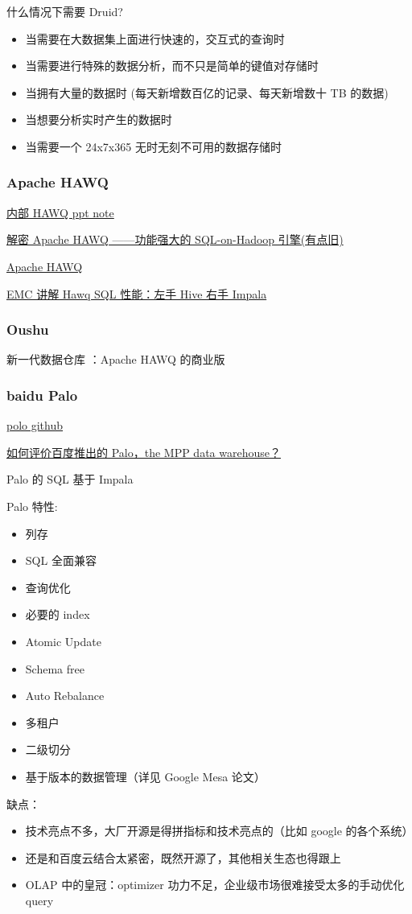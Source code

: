 \documentclass[hyperref, UTF-8]{ctexart}
\begin{document}
什么情况下需要 Druid?
\begin{itemize}
\item 当需要在大数据集上面进行快速的，交互式的查询时
\item 当需要进行特殊的数据分析，而不只是简单的键值对存储时
\item 当拥有大量的数据时 (每天新增数百亿的记录、每天新增数十 TB 的数据)
\item 当想要分析实时产生的数据时
\item 当需要一个 24x7x365 无时无刻不可用的数据存储时
\end{itemize}
\subsubsection{Apache HAWQ}
\label{sec:orgb450134}
\hyperref[org5ae5bde]{内部 HAWQ ppt note}

\href{http://www.36dsj.com/archives/36776}{解密 Apache HAWQ ——功能强大的 SQL-on-Hadoop 引擎(有点旧)}  

\href{http://hawq.incubator.apache.org}{Apache HAWQ}  

\href{http://cloud.chinabyte.com/news/99/12558599.shtml}{EMC 讲解 Hawq SQL 性能：左手 Hive 右手 Impala}
\subsubsection{Oushu}
\label{sec:orgce3644d}
新一代数据仓库 ：Apache HAWQ 的商业版
\subsubsection{baidu Palo}
\label{sec:orgd6532fe}
\href{https://github.com/baidu/palo}{polo github}   

\href{https://www.zhihu.com/question/63791253}{如何评价百度推出的 Palo，the MPP data warehouse？}  

Palo 的 SQL 基于 Impala  

Palo 特性:
\begin{itemize}
\item 列存
\item SQL 全面兼容
\item 查询优化
\item 必要的 index
\item Atomic Update
\item Schema free
\item Auto Rebalance
\item 多租户
\item 二级切分
\item 基于版本的数据管理（详见 Google Mesa 论文）
\end{itemize}
缺点：
\begin{itemize}
\item 技术亮点不多，大厂开源是得拼指标和技术亮点的（比如 google 的各个系统）
\item 还是和百度云结合太紧密，既然开源了，其他相关生态也得跟上
\item OLAP 中的皇冠：optimizer 功力不足，企业级市场很难接受太多的手动优化 query
\end{itemize}
\end{document}
